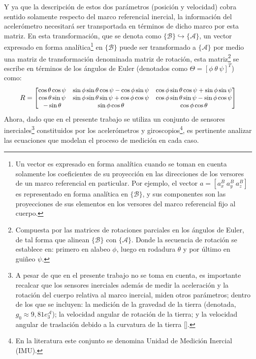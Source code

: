\documentclass[10pt]{report}
\numberwithin{equation}{chapter}
\numberwithin{algorithm}{chapter}
\newcommand{\marco}[1]{\{\mathcal{#1}\}}
\begin{document}
Y ya que la descripción de estos dos parámetros (posición y velocidad) cobra sentido solamente respecto del marco referencial inercial, la información del acelerómetro necesitará ser transportada en términos de dicho marco por esta matriz. En esta transformación, que se denota como $\marco{B}\hookrightarrow\marco{A}$, un vector expresado en forma analítica\footnote{Un vector es expresado en forma analítica cuando se toman en cuenta solamente los coeficientes de su proyección en las direcciones de los versores de un marco referencial en particular. Por ejemplo, el vector $a=[a^B_x~a^B_y~a^B_z]$ es representado en forma analítica en $\marco{B}$, y sus componentes son las proyecciones de sus elementos en los versores del marco referencial fijo al cuerpo.} en $\marco{B}$ puede ser transformado a $\marco{A}$ por medio una matriz de transformación denominada matriz de rotación, esta matriz\footnote{Compuesta por las matrices de rotaciones parciales en los ángulos de Euler, de tal forma que alinean $\marco{B}$ con $\marco{A}$. Donde la secuencia de rotación se establece en: primero en alabeo $\phi$, luego en rodadura $\theta$ y por último en guiñeo $\psi$.} se escribe en términos de los ángulos de Euler (denotados como $\Theta=[\phi~\theta~\psi]^T$) como:
\begin{equation}\label{modelo_ecc1}
\small{ R=
\begin{bmatrix}
\cos\theta\cos\psi & \sin\phi \sin\theta \cos\psi-\cos\phi \sin\psi & \cos\phi \sin\theta \cos\psi+\sin\phi\sin\psi\\
\cos\theta\sin\psi & \sin\phi\sin\theta\sin\psi + \cos\phi \cos\psi & \cos\phi \sin\theta \sin\psi - \sin\phi\cos\psi\\
-\sin\theta & \sin\phi\cos\theta & \cos\phi \cos\theta \\
\end{bmatrix}}
\end{equation}
Ahora, dado que en el presente trabajo se utiliza un conjunto de sensores inerciales\footnote{A pesar de que en el presente trabajo no se toma en cuenta, es importante recalcar que los sensores inerciales además de medir la aceleración y la rotación del cuerpo relativa al marco inercial, miden otros parámetros; dentro de los que se incluyen: la medición de la gravedad de la tierra (denotada, $g_0\approx9,81e_3^\mathcal{A}$); la velocidad angular de rotación de la tierra; y la velocidad angular de traslación debido a la curvatura de la tierra [\cite{Christensen2008}].} constituidos por los acelerómetros y giroscopios\footnote{En la literatura este conjunto se denomina Unidad de Medición Inercial (IMU).}, es pertinente analizar las ecuaciones que modelan el proceso de medición en cada caso.
\end{document}
